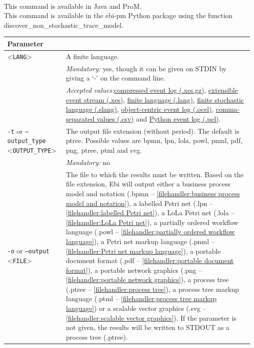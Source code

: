 {\\This command is available in Java and ProM.
\\This command is available in the ebi-pm Python package using the function discover\_non\_stochastic\_trace\_model.
\begin{tabularx}{\linewidth}{lX}
\toprule
Parameter \\\midrule
<\texttt{LANG}>&A finite language.\\
&\textit{Mandatory:} \quad yes, though it can be given on STDIN by giving a `-' on the command line.\\
&\textit{Accepted values:}\quad \hyperref[filehandler:compressed event log]{compressed event log (.xes.gz)}, \hyperref[filehandler:extensible event stream]{extensible event stream (.xes)}, \hyperref[filehandler:finite language]{finite language (.lang)}, \hyperref[filehandler:finite stochastic language]{finite stochastic language (.slang)}, \hyperref[filehandler:object-centric event log]{object-centric event log (.ocel)}, \hyperref[filehandler:comma-separated values]{comma-separated values (.csv)} and \hyperref[filehandler:Python event log]{Python event log (.pel)}.\\
\texttt{-t} or \texttt{--output\_type} <\texttt{OUTPUT\_TYPE}> &
The output file extension (without period). The default is ptree. Possible values are bpmn, lpn, lola, powl, pnml, pdf, png, ptree, ptml and svg.\\
&\textit{Mandatory:} \quad no\\
\texttt{-o} or \texttt{--output} <\texttt{FILE}> &
The file to which the results must be written. Based on the file extension, Ebi will output either a business process model and notation (.bpmn -- \cref{filehandler:business process model and notation}), a labelled Petri net (.lpn -- \cref{filehandler:labelled Petri net}), a LoLa Petri net (.lola -- \cref{filehandler:LoLa Petri net}), a partially ordered workflow language (.powl -- \cref{filehandler:partially ordered workflow language}), a Petri net markup language (.pnml -- \cref{filehandler:Petri net markup language}), a portable document format (.pdf -- \cref{filehandler:portable document format}), a portable network graphics (.png -- \cref{filehandler:portable network graphics}), a process tree (.ptree -- \cref{filehandler:process tree}), a process tree markup language (.ptml -- \cref{filehandler:process tree markup language}) or a scalable vector graphics (.svg -- \cref{filehandler:scalable vector graphics}).
If the parameter is not given, the results will be written to STDOUT as a process tree (.ptree).\\

\end{tabularx}}
